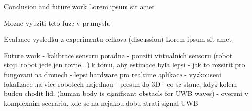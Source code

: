 \chap Conclusion and future work
Lorem ipsum sit amet

\sec Mozne vyuziti teto fuze v prumyslu

\sec Evaluace vysledku z experimentu celkova (discussion)
Lorem ipsum sit amet


\sec Future work
 - kalibrace sensoru poradna
 - pouziti virtualnich sensoru (robot stoji, robot jede jen rovne...) k tomu, aby estimace byla lepsi
 - jak to rozsirit pro fungovani na dronech
 - lepsi hardware pro realtime aplikace
 - vyzkouseni lokalizace na vice robotech najednou
 - presun do 3D
 - co se stane, kdyz kolem budou chodit lidi (human body is significant obstacle for UWB waves)
 - overeni v komplexnim scenariu, kde se na nejakou dobu ztrati signal UWB